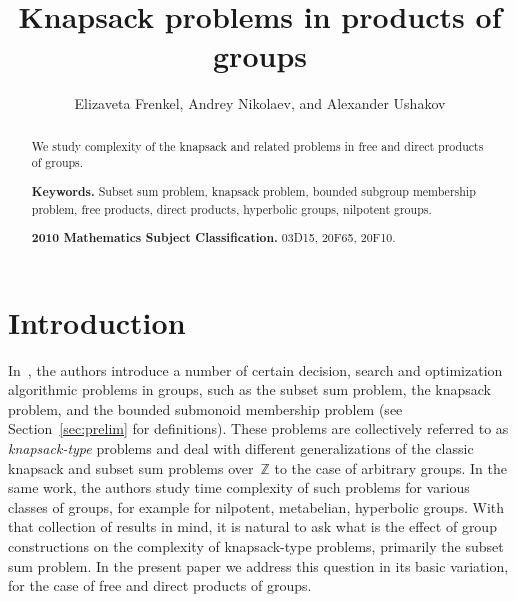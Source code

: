 \documentclass[10pt]{amsart}
\title{Knapsack problems in products of groups}
\author[]{Elizaveta Frenkel, Andrey Nikolaev, and Alexander Ushakov}
\theoremstyle{definition}
\begin{document}
\begin{abstract}
We study complexity of the knapsack and related problems in free and direct products of groups.

\noindent
{\bf Keywords.} Subset sum problem,  knapsack problem, bounded subgroup membership problem, free products, direct products, hyperbolic groups, nilpotent groups.

\noindent
{\bf 2010 Mathematics Subject Classification.} 03D15, 20F65, 20F10.
\end{abstract}
\maketitle


\section{Introduction}\label{sec:intro}


In~\cite{Miasnikov-Nikolaev-Ushakov:2014a}, the authors introduce a number of certain decision, search and optimization algorithmic problems in groups, such as the subset sum problem, the knapsack problem, and the bounded submonoid membership problem (see Section~\ref{sec:prelim} for definitions). These problems are collectively referred to as {\em knapsack-type} problems and deal with different generalizations of the classic knapsack and subset sum problems over~$\mathbb Z$ to the case of arbitrary groups. In the same work, the authors study time complexity of such problems for various classes of groups, for example for nilpotent, metabelian, hyperbolic groups. With that collection of results in mind, it is natural to ask what is the effect of group constructions on the complexity of knapsack-type problems, primarily the subset sum problem. In the present paper we address this question in its basic variation, for the case of free and direct products of groups.
\end{document}
